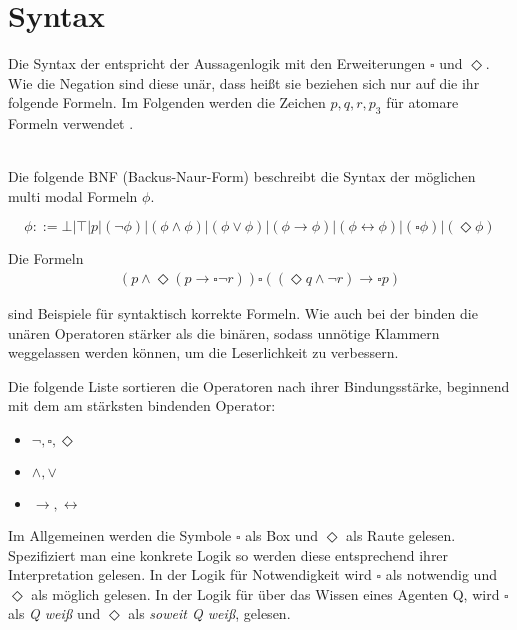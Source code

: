 
\section{Syntax} %
\label{sec:syntax}
Die Syntax der \ML entspricht der Aussagenlogik mit den Erweiterungen $\square$ und $\Diamond$. 
Wie die Negation sind diese unär, dass heißt sie beziehen sich nur auf die ihr folgende Formeln. 
Im Folgenden werden die Zeichen $p, q, r, p_3$ für atomare Formeln verwendet .\\
\\
\begin{definition}
	\label{def:syntax}
	Die folgende BNF (Backus-Naur-Form) beschreibt die Syntax der möglichen multi modal Formeln $\phi$.

	\begin{equation}
		\label{eqn:bnf}
		\phi ::= \bot|\top|p|(\neg\phi)|(\phi\wedge\phi)|(\phi\vee\phi)|(\phi\rightarrow\phi)|
		(\phi\leftrightarrow\phi)|(\square\phi)|(\Diamond\phi)
	\end{equation}
\end{definition}

Die Formeln 
\begin{align}
	(p \wedge \Diamond(p \rightarrow \square \neg r))
	\square((\Diamond q \wedge \neg r) \rightarrow \square p )	
\end{align} 

sind Beispiele für syntaktisch korrekte \MML Formeln. 
Wie auch bei der \AL binden die unären Operatoren stärker als die binären, sodass unnötige Klammern weggelassen werden können, um die Leserlichkeit zu verbessern.


Die folgende Liste sortieren die Operatoren nach ihrer Bindungsstärke, beginnend mit dem am stärksten bindenden Operator:\\
\label{bindungsstaerke}
\begin{itemize}
	\item $\neg, \square, \Diamond$
	\item $\wedge, \vee$
	\item $\rightarrow, \leftrightarrow$
\end{itemize}

Im Allgemeinen werden die Symbole $\square$ als Box und $\Diamond$ als Raute gelesen. 
Spezifiziert man eine konkrete Logik so werden diese entsprechend ihrer Interpretation gelesen. 
In der Logik für Notwendigkeit wird $\square$ als notwendig und $\Diamond$ als möglich gelesen. 
In der Logik für über das Wissen eines Agenten Q, wird $\square$ als \emph{Q weiß} und $\Diamond$ als \emph{soweit Q weiß}, gelesen.


